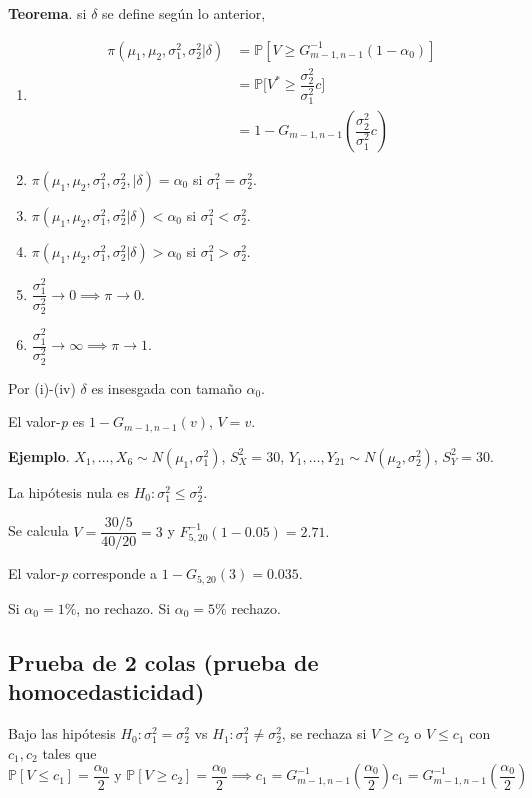 \documentclass[
  12pt,
]{book}
\begin{document}
\textbf{Teorema}. si \(\delta\) se define según lo anterior,

\begin{enumerate}
\def\labelenumi{\roman{enumi}.}
\item
  \begin{align*}
  \pi(\mu_1,\mu_2,\sigma_1^2,\sigma_2^2|\delta) & = \mathbb P[V\geq G^{-1}_{m-1,n-1}(1-\alpha_0)]\\
  & = \mathbb P\bigg[V^* \geq \dfrac{\sigma_2^2}{\sigma_1^2}c\bigg]\\
  & = 1-G_{m-1,n-1}\left(\dfrac{\sigma_2^2}{\sigma_1^2}c\right)
  \end{align*}
\item
  \(\pi(\mu_1,\mu_2,\sigma_1^2,\sigma_2^2,|\delta) = \alpha_0\) si \(\sigma_1^2 = \sigma_2^2\).
\item
  \(\pi(\mu_1,\mu_2,\sigma_1^2,\sigma_2^2|\delta) < \alpha_0\) si \(\sigma_1^2 < \sigma_2^2\).
\item
  \(\pi(\mu_1,\mu_2,\sigma_1^2,\sigma_2^2|\delta) > \alpha_0\) si \(\sigma_1^2 > \sigma_2^2\).
\item
  \(\dfrac{\sigma_1^2 }{\sigma_2^2 }\to 0 \implies \pi \to 0\).
\item
  \(\dfrac{\sigma_1^2 }{\sigma_2^2 }\to \infty \implies \pi \to 1\).
\end{enumerate}

Por (i)-(iv) \(\delta\) es insesgada con tamaño \(\alpha_0\).

El valor-\emph{p} es \(1-G_{m-1,n-1}(v)\), \(V=v\).

\textbf{Ejemplo}. \(X_1,\dots,X_{6}\sim N(\mu_1,\sigma_1^2)\), \(S_X ^2 =30\), \(Y_1,\dots,Y_{21}\sim N(\mu_2,\sigma_2^2)\), \(S_Y^2=30\).

La hipótesis nula es \(H_0: \sigma_1^2\leq \sigma_2^2\).

Se calcula \(V = \dfrac{30/5}{40/20} = 3\) y \(F^{-1}_{5,20}(1-0.05) = 2.71.\)

El valor-\emph{p} corresponde a \(1-G_{5,20}(3) = 0.035.\)

Si \(\alpha_0 = 1\%\), no rechazo. Si \(\alpha_0 = 5\%\) rechazo.

\hypertarget{prueba-de-2-colas-prueba-de-homocedasticidad}{%
\subsection{Prueba de 2 colas (prueba de homocedasticidad)}\label{prueba-de-2-colas-prueba-de-homocedasticidad}}

Bajo las hipótesis \(H_0: \sigma^2_1=\sigma^2_2\) vs \(H_1: \sigma^2_1\ne\sigma^2_2\), se rechaza si \(V\geq c_2\) o \(V\leq c_1\) con \(c_1,c_2\) tales que
\[\mathbb P[V\leq c_1] = \dfrac{\alpha_0}{2} \text{ y } \mathbb P[V\geq c_2] = \dfrac{\alpha_0}{2} \implies c_1 = G_{m-1,n-1}^{-1}\left(\dfrac{\alpha_0}{2}\right) c_1 = G_{m-1,n-1}^{-1}\left(\dfrac{\alpha_0}{2}\right)\]
\end{document}
